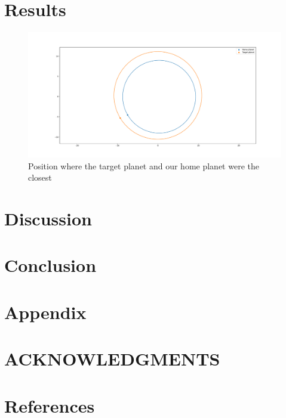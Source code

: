 \documentclass[reprint,english,notitlepage]{revtex4-2}
\begin{document}
\section{Results} \label{sec: results}
\begin{figure}[h!]
  \centering
  \includegraphics[scale = .18]{Figures/closest_orbit.pdf}
  \caption{Position where the target planet and our home planet were the closest}
  \label{fig: closest orbit}
\end{figure}
\section{Discussion} \label{sec: discussion}

\section{Conclusion} \label{sec: conclusion}

\section{Appendix} \label{sec: appendix}

\section*{ACKNOWLEDGMENTS}

\section*{References} \label{sec: references}
\end{document}
